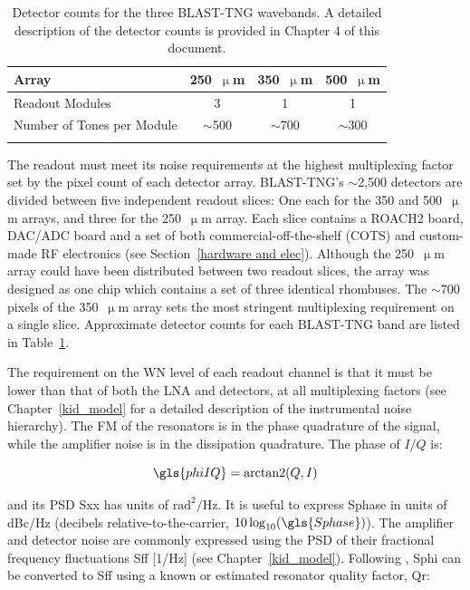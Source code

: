 \begin{table}[!htbp]
\centering
\begin{tabular}{@{}lccc@{}}
\dtoprule
Array                      & 250~$\upmu$m & 350~$\upmu$m & 500~$\upmu$m   \\ \midrule
Readout Modules            & 3               & 1               & 1  \\ \midrule
Number of Tones per Module & $\sim$500             & $\sim$700             &  $\sim$300   \\ \dbottomrule
\\
\end{tabular}
\caption[~Detector counts for the three BLAST-TNG wavebands.]{Detector counts for the three BLAST-TNG wavebands. A detailed description of the detector counts is provided in Chapter 4 of this document.}
\label{tab:det counts}
\end{table}

The readout must meet its noise requirements at the highest multiplexing factor set by the pixel count of each detector array. BLAST-TNG's $\sim$2,500 detectors are divided between five independent readout slices: One each for the 350 and 500~$\upmu$m arrays, and three for the 250~$\upmu$m array. Each slice contains a ROACH2 board, DAC/ADC board and a set of both commercial-off-the-shelf (COTS) and custom-made RF electronics (see Section~\ref{hardware and elec}). Although the 250~$\upmu$m array could have been distributed between two readout slices, the array was designed as one chip which contains a set of three identical rhombuses. The $\sim$700 pixels of the 350~$\upmu$m array sets the most stringent multiplexing requirement on a single slice. Approximate detector counts for each BLAST-TNG band are listed in Table~\ref{tab:det counts}.

The requirement on the WN level of each readout channel is that it must be lower than that of both the LNA and detectors, at all multiplexing factors (see Chapter~\ref{kid_model} for a detailed description of the instrumental noise hierarchy). The FM of the resonators is in the phase quadrature of the signal, while the amplifier noise is in the dissipation quadrature. The phase of $I/Q$ is:

\begin{equation}
  \gls{phiIQ} = \arctantwo(Q,I)
\end{equation}

and its PSD \gls{Sxx} has units of $\mathrm{rad}^{2}/\mathrm{Hz}$. It is useful to express \gls{Sphase} in units of dBc/Hz (decibels relative-to-the-carrier, $10\log_{10}(\gls{Sphase})$). The amplifier and detector noise are commonly expressed using the PSD of their fractional frequency fluctuations \gls{Sff} [1/Hz] (see Chapter~\ref{kid_model}). Following \citet{gao2008physics}, \gls{Sphi} can be converted to \gls{Sff} using a known or estimated resonator quality factor, \gls{Qr}:

